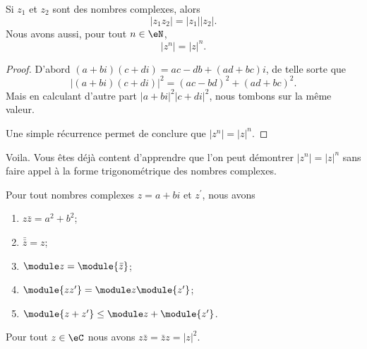 \begin{proposition} \label{PROPooXLARooYSDCsF}
 Si \( z_1\) et \( z_2\) sont des nombres complexes, alors 
 \begin{equation}
     | z_1z_2 |=| z_1 | |z_2 |.
 \end{equation}
 Nous avons aussi, pour tout \( n\in \eN\),
 \begin{equation}
     | z^n |=| z |^n.
 \end{equation}
\end{proposition}

\begin{proof}
    D'abord \( (a+bi)(c+di)=ac-db+(ad+bc)i\), de telle sorte que
    \begin{equation}
        | (a+bi)(c+di) |^2=(ac-bd)^2+(ad+bc)^2.
    \end{equation}
    Mais en calculant d'autre part \( | a+bi |^2| c+di |^2\), nous tombons sur la même valeur.

    Une simple récurrence permet de conclure que \( | z^n |=| z |^n\).
\end{proof}
Voila. Vous êtes déjà content d'apprendre que l'on peut démontrer \( | z^n |=| z |^n\) sans faire appel à la forme trigonométrique des nombres complexes.


\begin{proposition}     \label{PROPooUMVGooIrhZZg}
Pour tout nombres complexes $z = a+bi$ et $z^\prime$, nous avons
   \begin{enumerate}
   \item $z \bar z = a^2 + b^2$;
   \item $\bar{\bar{z}} = z$;
   \item $\module z = \module {\bar z}$;
   \item $\module{zz^\prime} = \module z \module{z^\prime}$;
   \item    \label{ITEMooDVMDooFDmOur}
       $\module{z+z^\prime} \leq \module z + \module{z^\prime}$.
   \end{enumerate}
\end{proposition}

\begin{lemma}   \label{LEMooONLNooXLNbtB}
    Pour tout \( z\in \eC\) nous avons \( z\bar z=\bar z z=| z |^2\).
\end{lemma}
